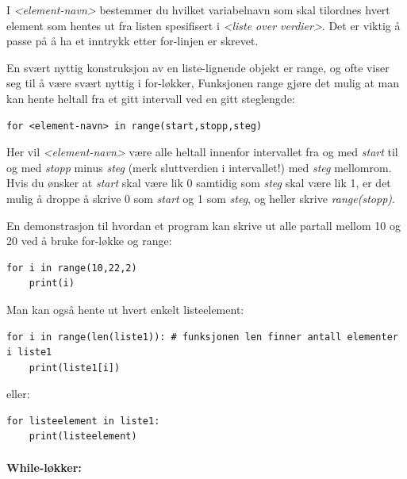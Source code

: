 \documentclass[%
oneside,                 %
final,                   %
10pt]{article}
\begin{document}
I \emph{<element-navn>} bestemmer du hvilket variabelnavn som skal tilordnes hvert element som hentes ut fra listen spesifisert i \emph{<liste over verdier>}.
Det er viktig å passe på å ha et inntrykk etter for-linjen er skrevet.


\vspace{3mm}


En svært nyttig konstruksjon av en liste-lignende objekt er range, og ofte viser seg til å være svært nyttig i for-løkker,
Funksjonen range gjøre det mulig at man kan hente heltall fra et gitt intervall ved en gitt steglengde:
\begin{verbatim}
for <element-navn> in range(start,stopp,steg)
\end{verbatim}
Her vil \emph{<element-navn>} være alle heltall innenfor intervallet fra og med \emph{start} til og med \emph{stopp} minus \emph{steg} (merk sluttverdien i intervallet!) med \emph{steg} mellomrom. Hvis du ønsker at \emph{start} skal være lik 0 samtidig som \emph{steg} skal være lik 1, er
det mulig å droppe å skrive 0 som \emph{start} og 1 som \emph{steg}, og heller skrive \emph{range(stopp)}.

En demonstrasjon til hvordan et program kan skrive ut alle partall mellom 10 og 20 ved å bruke for-løkke og range:
\begin{verbatim}
for i in range(10,22,2)
    print(i)
\end{verbatim}

Man kan også hente ut hvert enkelt listeelement:
\begin{verbatim}
for i in range(len(liste1)): # funksjonen len finner antall elementer i liste1
    print(liste1[i])
\end{verbatim}
eller:
\begin{verbatim}
for listeelement in liste1:
    print(listeelement)
\end{verbatim}


\vspace{3mm}


\paragraph{While-løkker:}
\end{document}
